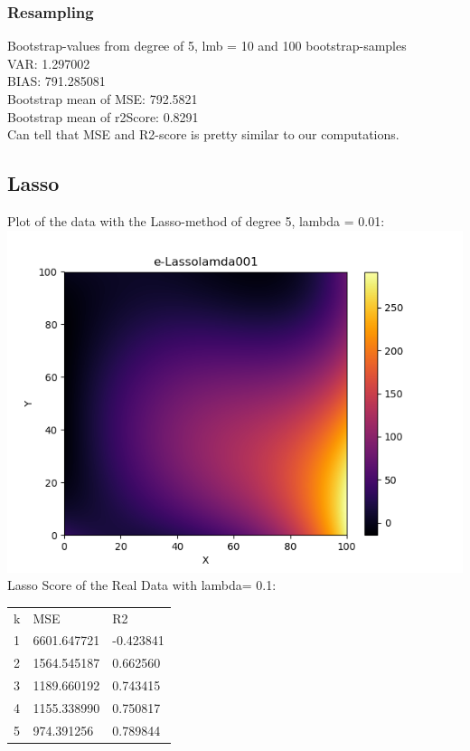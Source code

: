 \documentclass[a4paper,norsk]{article}
\begin{document}
\subsubsection{Resampling}
Bootstrap-values from degree of 5, lmb = 10 and 100 bootstrap-samples
\\VAR: 1.297002
\\BIAS: 791.285081
\\Bootstrap mean of MSE: 792.5821
\\Bootstrap mean of r2Score: 0.8291
\\Can tell that MSE and R2-score is pretty similar to our computations.
\subsection{Lasso}
Plot of the data with the Lasso-method of degree 5, lambda = 0.01:
\\ \includegraphics[scale=.7]{e-Lassolamda001}
\\ Lasso Score of the Real Data with lambda= 0.1:
\begin{table}[!h]
\begin{tabular}{lll}
k & MSE                   & R2                 \\
1 & 6601.647721  & -0.423841 \\
2 & 1564.545187  & 0.662560 \\
3 & 1189.660192  & 0.743415 \\
4 & 1155.338990  & 0.750817 \\
5 & 974.391256 & 0.789844
\end{tabular}
\end{table}
\end{document}
